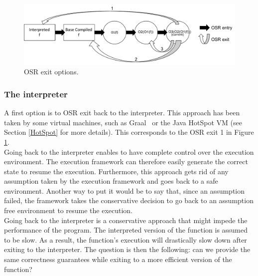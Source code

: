 \begin{figure}[h]
\centering
\includegraphics[scale=0.5]{Figures/wheretoexit}
\decoRule
\caption[OSR exit options]{OSR exit options.}
\label{OSR exit options}
\end{figure}

\subsubsection{The interpreter}
A first option is to OSR exit back to the interpreter. 
This approach has been taken by some virtual machines, such as Graal~\cite{duboscq2014speculation} or the Java HotSpot VM\cite{paleczny2001java} (see Section \ref{HotSpot} for more details).
This corresponds to the OSR exit 1 in Figure \ref{OSR exit options}.\\

Going back to the interpreter enables to have complete control over the execution environment.
The execution framework can therefore easily generate the correct state to resume the execution.
Furthermore, this approach gets rid of any assumption taken by the execution framework and goes back to a safe environment.
Another way to put it would be to say that, since an assumption failed, the framework takes the conservative decision to go back to an assumption free environment to resume the execution.\\

Going back to the interpreter is a conservative approach that might impede the performance of the program.
The interpreted version of the function is assumed to be slow.
As a result, the function's execution will drastically slow down after exiting to the interpreter.
The question is then the following: can we provide the same correctness guarantees while exiting to a more efficient version of the function?\\

